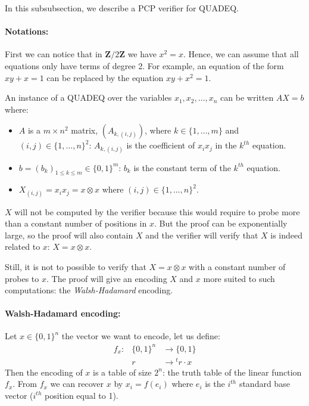 In this subsubsection, we describe a PCP verifier for \textsf{QUADEQ}. 

\paragraph{Notations:} First we can notice that in $\mathbf{Z}/2\mathbf{Z}$ we
have $x^2=x$. Hence, we can assume that all equations only have terms of degree
2. For example, an equation of the form $xy + x =1 $ can be replaced by the
equation $xy + x^2=1$.

An instance of a \textsf{QUADEQ} over the variables $x_1,x_2,\ldots,x_n$ can be
written $AX=b$ where:
\begin{itemize}
\item $A$ is a $m \times n^2$ matrix, $(A_{k,( i, j)})$, where
$k\in\{1,\ldots,m\}$ and $(i,j)\in\{1,\ldots,n\}^2$: $ A_{k,( i, j)}$ is the
coefficient of $x_ix_j$ in the $k^{th}$ equation.
\item  $b = (b_k)_{1\leq k\leq m}\in\{0,1\}^m$: $b_k$
is the constant term of the $k^{th}$ equation.
\item $X_{( i, j)}=x_{i}x_{j}=x\otimes x$ where $(i,j)\in\{1,\ldots,n\}^2$.
\end{itemize}

$X$ will not be computed by the verifier because this would require to probe
more than a constant number of positions in $x$. But the proof can be
exponentially large, so the proof will also contain $X$ and the verifier will
verify that $X$ is indeed related to $x$: $X=x\otimes x$.

Still, it is not to possible to verify that $X=x\otimes x$ with a constant
number of probes to $x$. The proof will give an encoding $X$ and $x$ more
suited to such computations: the \emph{Walsh-Hadamard} encoding.

\paragraph{Walsh-Hadamard encoding:} Let $x\in\{0,1\}^n$ the vector we want to
encode, let us define:
\begin{displaymath}
\begin{array}{rrl}
f_x:&\{0,1\}^n&\longrightarrow\{0,1\}\\
&r&\longrightarrow{}^tr\cdot x
\end{array}
\end{displaymath}
Then the encoding of $x$ is a table of size $2^n$: the truth table of the
linear function $f_x$. From $f_x$ we can recover $x$ by $x_i=f(e_i)$ where $e_i$
is the $i^{th}$ standard base vector ($i^{th}$ position equal to 1).

